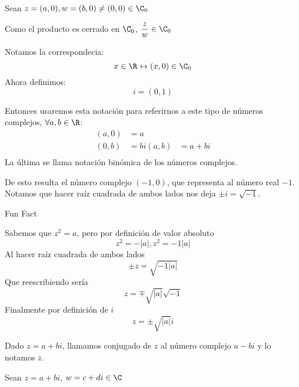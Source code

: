 \documentclass[10pt]{article}
\begin{document}
\begin{prf}{}
	Sean $z = (a,0), w = (b,0) \neq (0,0) \in \C_0$\\


	Como el producto es cerrado en $\C_0$, $\dfrac{z}{w} \in \C_0$
\end{prf}
Notamos la correspondecia:
$$x \in \R \leftrightarrow (x,0) \in \C_0$$
Ahora definimos:
$$i = (0,1)$$
\begin{prf}{}
\end{prf}
Entonces usaremos esta notación para referirnos a este tipo de números complejos, $\forall a,b \in \R$:
\begin{align}
	(a,0) &= a\\
	(0,b) &= bi
	(a,b) &= a+bi\\
\end{align}
La última se llama notación binómica de los números complejos.
\begin{prf}[$i^2 = -1$]{}
	De esto resulta el número complejo $(-1,0)$, que representa al número real $-1$.
	Notamos que hacer raíz cuadrada de ambos lados nos deja $\pm i = \sqrt{-1}$.
\end{prf}

Fun Fact
\begin{prf}[$a \in \R, a < 0, z^2 = a \Leftrightarrow z = \pm\sqrt{|a|}i$]{}
	Sabemos que $z^2 = a$, pero por definición de valor absoluto
	$$z^2 = -|a|, z^2 = -1|a|$$
	Al hacer raíz cuadrada de ambos lados
	$$\pm z = \sqrt{-1|a|}$$
	Que reescribiendo sería
	$$z = \mp \sqrt{|a|}\sqrt{-1}$$
	Finalmente por definición de $i$
	$$z = \pm \sqrt{|a|}i$$

\end{prf}
Dado $z = a+bi$, llamamos conjugado de $z$ al número complejo $a-bi$ y lo notamos $\overline{z}$.

\begin{prf}{}
	Sean $z = a+bi$, $w = c+di \in \C$\\

\end{prf}
\end{document}
